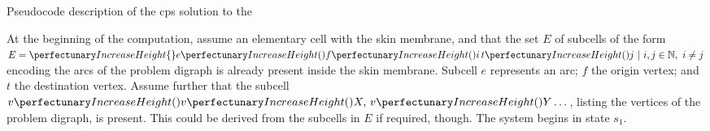     

\begin{algorithm}
\DontPrintSemicolon
{}
\caption{\label{alg:tsp:hpp}Pseudocode description of the \gls{cps} solution to the }
\end{algorithm}

At the beginning of the computation, assume an elementary cell with the skin membrane, and that the set \(E\) of subcells of the form \(E = \cpset{\cpfunc{e}{\cpfunc{f}{i} \, \cpfunc{t}{j}} ~ | ~ i,j \in \mathbb{N}, ~ i \neq j}\) encoding the arcs of the problem digraph is already present inside the skin membrane.  Subcell \(e\) represents an arc; \(f\) the origin vertex; and \(t\) the destination vertex.  Assume further that the subcell \(\cpfunc{v}{\cpfunc{v}{X}, \, \cpfunc{v}{Y} \dots}\), listing the vertices of the problem digraph, is present.  This could be derived from the subcells in \(E\) if required, though.  The system begins in state \(s_1\).

